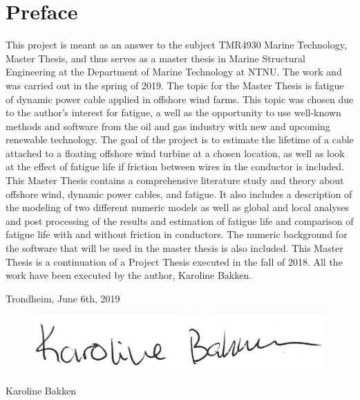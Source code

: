 \hypersetup{pageanchor=true}
%
\chapter*{Preface}
This project is meant as an answer to the subject TMR4930 Marine Technology, Master Thesis, and thus serves as a master thesis in Marine Structural Engineering at the Department of Marine Technology at NTNU. The work and was carried out in the spring of 2019. \newline
\newline
The topic for the Master Thesis is fatigue of dynamic power cable applied in offshore wind farms. This topic was chosen due to the author's interest for fatigue, a well as the opportunity to use well-known methods and software from the oil and gas industry with new and upcoming renewable technology. The goal of the project is to estimate the lifetime of a cable attached to a floating offshore wind turbine at a chosen location, as well as look at the effect of fatigue life if friction between wires in the conductor is included. This Master Thesis contains a comprehensive literature study and theory about offshore wind, dynamic power cables, and fatigue. It also includes a description of the modeling of two different numeric models as well as global and local analyses and post processing of the results and estimation of fatigue life and comparison of fatigue life with and without friction in conductors. The numeric background for the software that will be used in the master thesis is also included. \newline
\newline
This Master Thesis is a continuation of a Project Thesis executed in the fall of 2018. All the work have been executed by the author, Karoline Bakken. 
\newline
\newline
\newline
\newline
\newline
\newline
\begin{center}
    Trondheim, June 6th, 2019
    \end{center}
\begin{figure}[H]
\centering
\includegraphics[scale=0.5]{figures/sign}
\end{figure}
\begin{center}
Karoline Bakken
\end{center}
